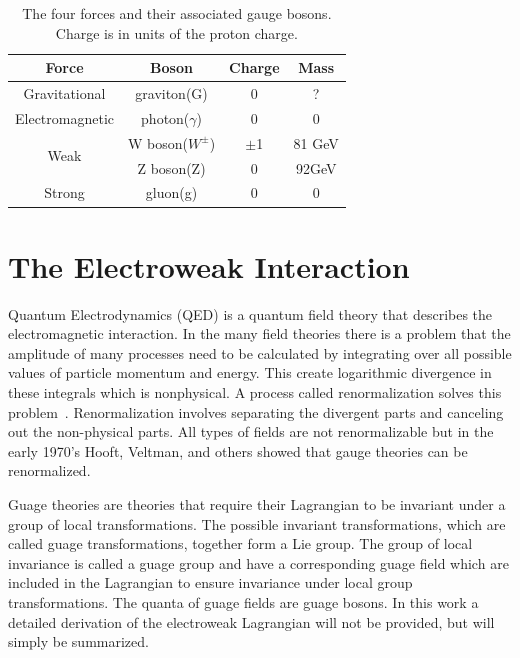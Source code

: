 \begin{center}
\begin{table}[htb]
\caption{%
  \small The four forces and their associated gauge bosons. Charge is in units of the proton charge.%
}
\begin{center}
\begin{tabular}{ c c c c }
Force  & Boson    & Charge & Mass \\ \hline
Gravitational & graviton(G) & 0 & ? \\
Electromagnetic & photon($\gamma$) & 0 & 0 \\

\multirow{2}{*}{Weak} & W boson($W^{\pm}$) & $\pm$1 & 81 GeV \\
                      & Z boson(Z) & 0 & 92GeV \\

Strong & gluon(g) & 0      & 0 \\
\end{tabular}
\end{center}
\label{tab:FundamentalForces}
\end{table}

\end{center}




\section{The Electroweak Interaction}

Quantum Electrodynamics (QED) is a quantum field theory that describes the electromagnetic interaction.  In the many field theories there is a problem that the amplitude of many processes need to be calculated by integrating over all possible values of particle momentum and energy.  This create logarithmic divergence in these integrals which is nonphysical. A process called renormalization solves this problem~\cite{Peskin:1995}.  Renormalization involves separating the divergent parts and canceling out the non-physical parts.  All types of fields are not renormalizable but in the early 1970's Hooft, Veltman, and others showed that gauge theories can be renormalized\cite{Hooft:1971}\cite{Hooft:1972}.

Guage theories are theories that require their Lagrangian to be invariant under a group of local transformations. The possible invariant transformations, which are called guage transformations, together form a Lie group.  The group of local invariance is called a guage group and have a corresponding guage field which are included in the Lagrangian to ensure invariance under local group transformations.  The quanta of guage fields are guage bosons\cite{Wiki:Guage_Theory}.  In this work a detailed derivation of the electroweak Lagrangian will not be provided, but will simply be summarized.

